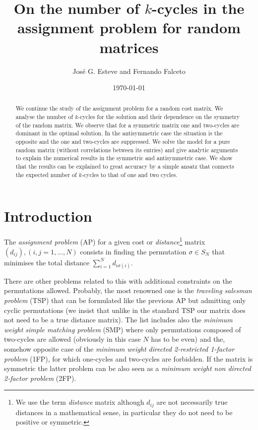\documentclass[]{iopart}
\begin{document}
\title{\bf{On the number of $k$-cycles in the assignment problem 
for random matrices}}

\author{Jos\'e G. Esteve and Fernando Falceto  } 
\address{ Departamento de F\'{\i}sica Te\'orica, Facultad de Ciencias and \\
Instituto de Biocomputaci\'on y F\'{\i}sica de sistemas complejos.\\
Universidad de Zaragoza,
E-50009 Zaragoza (Spain)
}
\date{\today}



\begin{abstract}


We continue the study of the assignment problem
for a random cost matrix. We analyse the number of $k$-cycles
for the solution and their dependence on the 
symmetry of the random matrix. We observe that for a
symmetric matrix one and two-cycles are dominant
in the optimal solution. In the antisymmetric case 
the situation is the opposite
and the one and two-cycles are suppressed.
We solve the model for a pure random matrix
(without correlations between its entries) 
and  give analytic arguments to explain
the  numerical results in the symmetric and 
antisymmetric case. We show that the results can be
explained to great accuracy by a simple
ansatz that connects the expected number of
$k$-cycles to that of one and two cycles. 


\end{abstract}


\section{Introduction}

The {\it assignment problem} (AP) for a given cost or {\it distance}\footnote{We use the term {\it distance} matrix although $d_{{i}{j}}$ are not 
necessarily true distances in a mathematical sense,
in particular they do not need to be positive or symmetric.}
matrix $(d_{{i}{j}}), (i,j=1,\dots, N)$
consists in finding the permutation $\sigma\in S_N$ that minimises
the total distance $\sum_{i=1}^N d_{i\sigma(i)}$. 


There are other problems related to this 
with additional constraints on the permutations allowed.
Probably, the most renowned one is the {\it traveling salesman problem}
(TSP) that can be formulated like the previous AP but
admitting only cyclic permutations 
(we insist that unlike in the standard TSP
our matrix does not need to be a true distance matrix).
The list includes also the {\it minimum weight simple matching 
problem} (SMP)
where only permutations composed of two-cycles are allowed
(obviously in this case $N$ has to be even) and the, somehow opposite case
of  the {\it minimum weight directed  2-restricted 1-factor problem} (1FP), 
for which one-cycles and two-cycles are 
forbidden. If the matrix is symmetric the latter problem can be also 
seen as a {\it minimum weight non directed 2-factor problem} (2FP).
 
\end{document}
